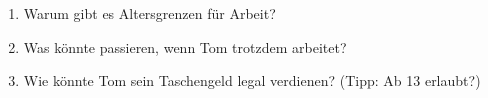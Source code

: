\documentclass[12pt, a4paper]{article}
\newenvironment{taskbox}{%
    \begin{framed}
        \color{black}
    }{%
    \end{framed}
}
\begin{document}
    \begin{taskbox}
        \begin{enumerate}
            \item Warum gibt es Altersgrenzen für Arbeit?
            \item Was könnte passieren, wenn Tom trotzdem arbeitet?
            \item Wie könnte Tom sein Taschengeld legal verdienen? (Tipp: Ab 13 erlaubt?)
        \end{enumerate}
    \end{taskbox}
\end{document}
